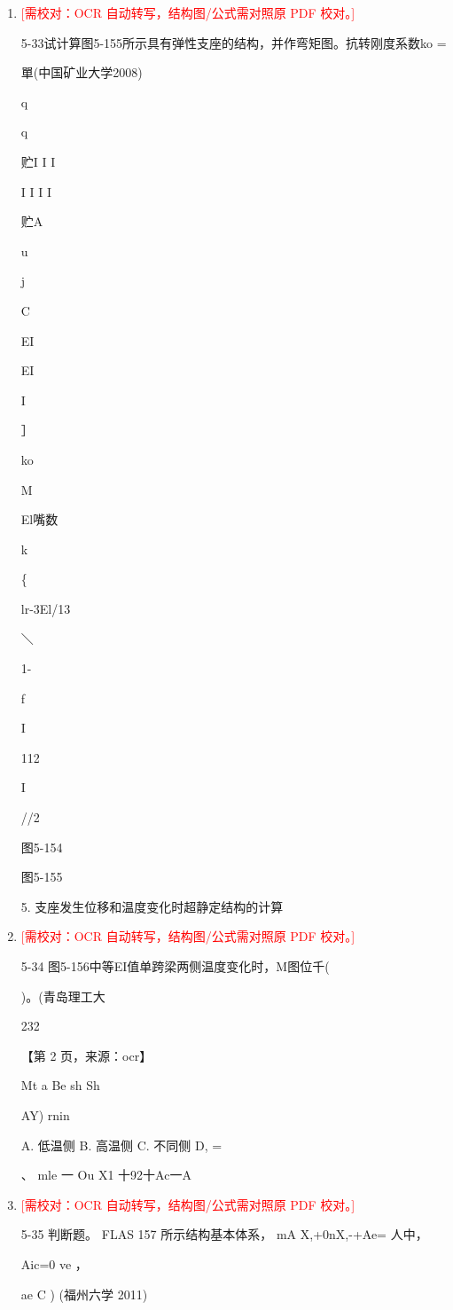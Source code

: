 \documentclass[UTF8,12pt,a4paper,openany]{ctexbook}
\newcommand{\TODO}[1]{\textcolor{red}{[需校对：#1]}}
\begin{document}
\begin{enumerate}[label=\textbf{\arabic*.},leftmargin=2em]
\item \TODO{OCR 自动转写，结构图/公式需对照原 PDF 校对。}\par 5-33试计算图5-155所示具有弹性支座的结构，并作弯矩图。抗转刚度系数ko =\par 單(中国矿业大学2008)\par q\par q\par 贮I I I\par I I I I\par 贮A\par u\par j\par C\par EI\par EI\par I\par ］\par ko\par M\par El嘴数\par k\par \{\par lr-3El/13\par ＼\par 1-\par f\par I\par 112\par I\par //2\par 图5-154\par 图5-155\par 5. 支座发生位移和温度变化时超静定结构的计算
\item \TODO{OCR 自动转写，结构图/公式需对照原 PDF 校对。}\par 5-34 图5-156中等EI值单跨梁两侧温度变化时，M图位千(\par )。(青岛理工大\par 232\par \par 【第 2 页，来源：ocr】\par Mt a Be sh Sh\par AY) rnin\par A. 低温侧       B. 高温侧       C. 不同侧       D, =\par 、        mle     一                       Ou X1 十92十Ac一A
\item \TODO{OCR 自动转写，结构图/公式需对照原 PDF 校对。}\par 5-35 判断题。 FLAS  157 所示结构基本体系， mA X,+0nX,-+Ae= 人中，\par Aic=0          ve                ，\par ae C  ) (福州六学 2011)

\end{enumerate}
\end{document}
